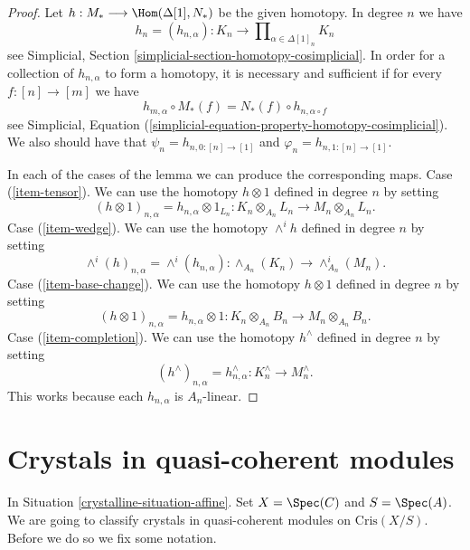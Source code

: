 \begin{proof}
Let $h : M_* \longrightarrow \Hom(\Delta[1], N_*)$ be the given
homotopy. In degree $n$ we have
$$
h_n = (h_{n, \alpha}) :
K_n \longrightarrow
\prod\nolimits_{\alpha \in \Delta[1]_n} K_n
$$
see Simplicial, Section \ref{simplicial-section-homotopy-cosimplicial}.
In order for a collection of $h_{n, \alpha}$ to form a homotopy,
it is necessary and sufficient if for every $f : [n] \to [m]$ we
have
$$
h_{m, \alpha} \circ M_*(f) = N_*(f) \circ h_{n, \alpha \circ f}
$$
see
Simplicial, Equation (\ref{simplicial-equation-property-homotopy-cosimplicial}).
We also should have that $\psi_n = h_{n, 0 : [n] \to [1]}$ and
$\varphi_n = h_{n, 1 : [n] \to [1]}$.

\medskip\noindent
In each of the cases of the lemma we can produce the corresponding maps.
Case (\ref{item-tensor}). We can use the homotopy $h \otimes 1$ defined
in degree $n$ by setting
$$
(h \otimes 1)_{n, \alpha} = h_{n, \alpha} \otimes 1_{L_n} :
K_n \otimes_{A_n} L_n
\longrightarrow
M_n \otimes_{A_n} L_n.
$$
Case (\ref{item-wedge}). We can use the homotopy $\wedge^ih$ defined
in degree $n$ by setting
$$
\wedge^i(h)_{n, \alpha} = \wedge^i(h_{n, \alpha}) :
\wedge_{A_n}(K_n)
\longrightarrow
\wedge^i_{A_n}(M_n).
$$
Case (\ref{item-base-change}). We can use the homotopy $h \otimes 1$ defined
in degree $n$ by setting
$$
(h \otimes 1)_{n, \alpha} = h_{n, \alpha} \otimes 1 :
K_n \otimes_{A_n} B_n
\longrightarrow
M_n \otimes_{A_n} B_n.
$$
Case (\ref{item-completion}). We can use the homotopy $h^\wedge$ defined
in degree $n$ by setting
$$
(h^\wedge)_{n, \alpha} = h_{n, \alpha}^\wedge :
K_n^\wedge
\longrightarrow
M_n^\wedge.
$$
This works because each $h_{n, \alpha}$ is $A_n$-linear.
\end{proof}

\section{Crystals in quasi-coherent modules}
\label{crystalline-section-quasi-coherent-crystals}
In Situation \ref{crystalline-situation-affine}.
Set $X = \Spec(C)$ and $S = \Spec(A)$. We are going to
classify crystals in quasi-coherent modules on $\text{Cris}(X/S)$.
Before we do so we fix some notation.

